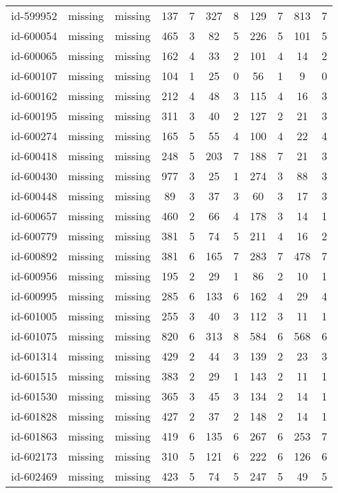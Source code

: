 \begin{tabular}{ccccccccccc}
id-599952 & missing & missing & 137 & 7 & 327 & 8 & 129 & 7 & 813 & 7\\
id-600054 & missing & missing & 465 & 3 & 82 & 5 & 226 & 5 & 101 & 5\\
id-600065 & missing & missing & 162 & 4 & 33 & 2 & 101 & 4 & 14 & 2\\
id-600107 & missing & missing & 104 & 1 & 25 & 0 & 56 & 1 & 9 & 0\\
id-600162 & missing & missing & 212 & 4 & 48 & 3 & 115 & 4 & 16 & 3\\
id-600195 & missing & missing & 311 & 3 & 40 & 2 & 127 & 2 & 21 & 3\\
id-600274 & missing & missing & 165 & 5 & 55 & 4 & 100 & 4 & 22 & 4\\
id-600418 & missing & missing & 248 & 5 & 203 & 7 & 188 & 7 & 21 & 3\\
id-600430 & missing & missing & 977 & 3 & 25 & 1 & 274 & 3 & 88 & 3\\
id-600448 & missing & missing & 89 & 3 & 37 & 3 & 60 & 3 & 17 & 3\\
id-600657 & missing & missing & 460 & 2 & 66 & 4 & 178 & 3 & 14 & 1\\
id-600779 & missing & missing & 381 & 5 & 74 & 5 & 211 & 4 & 16 & 2\\
id-600892 & missing & missing & 381 & 6 & 165 & 7 & 283 & 7 & 478 & 7\\
id-600956 & missing & missing & 195 & 2 & 29 & 1 & 86 & 2 & 10 & 1\\
id-600995 & missing & missing & 285 & 6 & 133 & 6 & 162 & 4 & 29 & 4\\
id-601005 & missing & missing & 255 & 3 & 40 & 3 & 112 & 3 & 11 & 1\\
id-601075 & missing & missing & 820 & 6 & 313 & 8 & 584 & 6 & 568 & 6\\
id-601314 & missing & missing & 429 & 2 & 44 & 3 & 139 & 2 & 23 & 3\\
id-601515 & missing & missing & 383 & 2 & 29 & 1 & 143 & 2 & 11 & 1\\
id-601530 & missing & missing & 365 & 3 & 45 & 3 & 134 & 2 & 14 & 1\\
id-601828 & missing & missing & 427 & 2 & 37 & 2 & 148 & 2 & 14 & 1\\
id-601863 & missing & missing & 419 & 6 & 135 & 6 & 267 & 6 & 253 & 7\\
id-602173 & missing & missing & 310 & 5 & 121 & 6 & 222 & 6 & 126 & 6\\
id-602469 & missing & missing & 423 & 5 & 74 & 5 & 247 & 5 & 49 & 5\\

\end{tabular}
